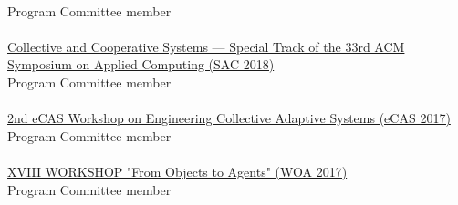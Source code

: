 \\ Program Committee member \\
\halfblankline \\
\href{http://sac-cas2018.apice.unibo.it/referees.html}{Collective and Cooperative Systems --- Special Track of the 33rd ACM Symposium on Applied Computing (SAC 2018)}
\\ Program Committee member \\
\halfblankline \\
\href{http://apice.unibo.it/xwiki/bin/view/ECAS2017/WebHome}{2nd eCAS Workshop on Engineering Collective Adaptive Systems (eCAS 2017)}
\\ Program Committee member \\
\halfblankline \\
\href{http://woa2017.unirc.it/}{XVIII WORKSHOP "From Objects to Agents" (WOA 2017)}
\\ Program Committee member \\
